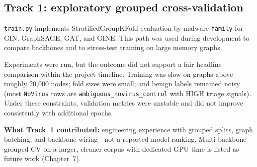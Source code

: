 
\subsection{Track 1: exploratory grouped cross-validation}

\texttt{train.py} implements StratifiedGroupKFold evaluation by malware \texttt{family} for GIN, GraphSAGE, GAT, and GINE. This path was used during development to compare backbones and to stress-test training on large memory graphs.

Experiments were run, but the outcome did not support a fair headline comparison within the project timeline. Training was slow on graphs above roughly 20{,}000 nodes; fold sizes were small; and benign labels remained noisy (most \texttt{NoVirus} rows are \texttt{ambiguous\_novirus\_control} with HIGH triage signals). Under these constraints, validation metrics were unstable and did not improve consistently with additional epochs.

\textbf{What Track~1 contributed:} engineering experience with grouped splits, graph batching, and backbone wiring---not a reported model ranking. Multi-backbone grouped CV on a larger, cleaner corpus with dedicated GPU time is listed as future work (Chapter~7).
